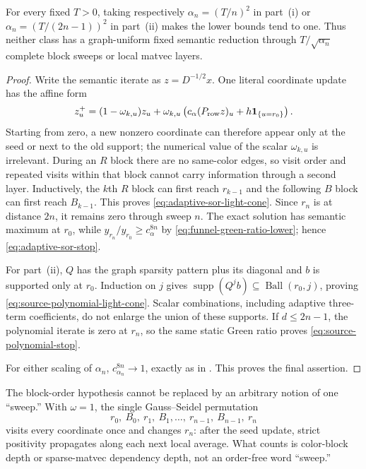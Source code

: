 \begin{theorem}
For every fixed $T>0$, taking respectively
$\alpha_n=(T/n)^2$ in part~(i) or
$\alpha_n=(T/(2n-1))^2$ in part~(ii) makes the lower bounds tend to one.
Thus neither class has a graph-uniform fixed semantic reduction through
$T/\sqrt{\alpha_n}$ complete block sweeps or local matvec layers.
\end{theorem}

\begin{proof}
Write the semantic iterate as $z=D^{-1/2}x$.  One literal coordinate update
has the affine form
\begin{equation}
 z_u^+=(1-\omega_{k,u})z_u
 +\omega_{k,u}\left(c_\alpha(P_{\rm row}z)_u
 +h\mathbf1_{\{u=r_0\}}\right).
 \label{eq:adaptive-semantic-row-update}
\end{equation}
Starting from zero, a new nonzero coordinate can therefore appear only at
the seed or next to the old support; the numerical value of the scalar
$\omega_{k,u}$ is irrelevant.  During an $R$ block there are no same-color
edges, so visit order and repeated visits within that block cannot carry
information through a second layer.  Inductively, the $k$th $R$ block can
first reach $r_{k-1}$ and the following $B$ block can first reach $B_{k-1}$.
This proves \eqref{eq:adaptive-sor-light-cone}.  Since $r_n$ is at distance
$2n$, it remains zero through sweep $n$.  The exact solution has semantic
maximum at $r_0$, while
$y_{r_n}/y_{r_0}\ge c_\alpha^{8n}$ by
\eqref{eq:funnel-green-ratio-lower}; hence
\eqref{eq:adaptive-sor-stop}.

For part~(ii), $Q$ has the graph sparsity pattern plus its diagonal and $b$ is
supported only at $r_0$.  Induction on $j$ gives
$\operatorname{supp}(Q^jb)\subseteq\operatorname{Ball}(r_0,j)$, proving
\eqref{eq:source-polynomial-light-cone}.  Scalar combinations, including
adaptive three-term coefficients, do not enlarge the union of these
supports.  If $d\le2n-1$, the polynomial iterate is zero at $r_n$, so the
same static Green ratio proves \eqref{eq:source-polynomial-stop}.

For either scaling of $\alpha_n$,
$c_{\alpha_n}^{8n}\to1$, exactly as in
.  This proves the final assertion.
\end{proof}

The block-order hypothesis cannot be replaced by an arbitrary notion of one
``sweep.''  With $\omega=1$, the single Gauss--Seidel permutation
\begin{equation}
 r_0,\ B_0,\ r_1,\ B_1,\ldots,\ r_{n-1},\ B_{n-1},\ r_n
 \label{eq:interleaved-funnel-order}
\end{equation}
visits every coordinate once and changes $r_n$: after the seed update, strict
positivity propagates along each next local average.  What
 counts is color-block depth
or sparse-matvec dependency depth, not an order-free word ``sweep.''

